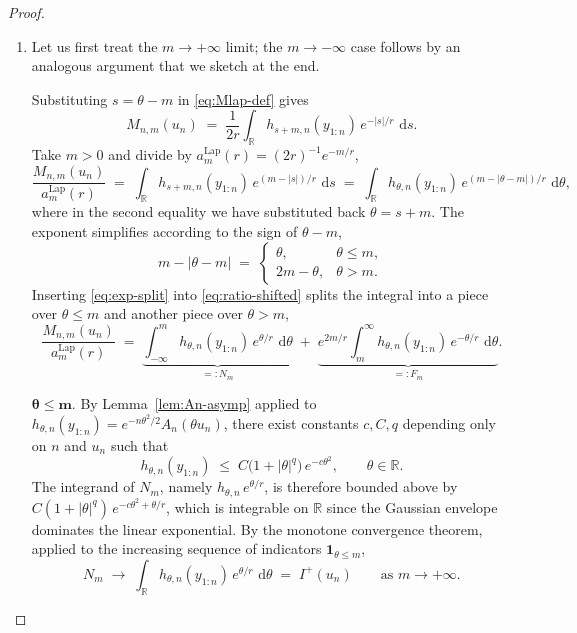 \documentclass[numsec,webpdf,modern,medium,namedate]{oup-authoring-template}
\theoremstyle{thmstyleone}%
\theoremstyle{thmstyletwo}%
\theoremstyle{thmstylethree}%
\newcommand{\dd}{\,\mathrm{d}}
\newcommand{\Lap}{\mathrm{Lap}}
\newcommand{\1}{\mathbf{1}}
\begin{document}
\begin{proof}
\begin{enumerate}
    \item[(a)] Let us first treat the $m\to+\infty$ limit; the $m\to-\infty$ case follows by an
analogous argument that we sketch at the end.

Substituting $s = \theta - m$ in \eqref{eq:Mlap-def} gives
\begin{equation}\label{eq:Mlap-shifted}
  M_{n,m}(u_n)
  \;=\;\frac{1}{2r}\int_\mathbb{R} h_{s+m,n}(y_{1:n})\,e^{-|s|/r}\,\dd s.
\end{equation}
Take $m>0$ and divide by $a_m^{\Lap}(r) = (2r)^{-1}e^{-m/r}$,
\begin{equation}\label{eq:ratio-shifted}
  \frac{M_{n,m}(u_n)}{a_m^{\Lap}(r)}
  \;=\;\int_\mathbb{R} h_{s+m,n}(y_{1:n})\,e^{(m-|s|)/r}\,\dd s
  \;=\;\int_\mathbb{R} h_{\theta,n}(y_{1:n})\,e^{(m-|\theta-m|)/r}\,\dd\theta,
\end{equation}
where in the second equality we have substituted back $\theta = s+m$.
The exponent simplifies according to the sign of $\theta-m$,
\begin{equation}\label{eq:exp-split}
  m - |\theta-m|
  \;=\;
  \begin{cases}
    \theta, & \theta \leq m,\\[2pt]
    2m-\theta, & \theta > m.
  \end{cases}
\end{equation}
Inserting \eqref{eq:exp-split} into \eqref{eq:ratio-shifted} splits the
integral into a piece over $\theta\leq m$ and another piece over $\theta>m$,
\begin{equation}\label{eq:two-pieces}
  \frac{M_{n,m}(u_n)}{a_m^{\Lap}(r)}
  \;=\;\underbrace{\int_{-\infty}^m h_{\theta,n}(y_{1:n})\,e^{\theta/r}\,\dd\theta}_{=:N_m}
  \;+\;\underbrace{e^{2m/r}\int_m^\infty h_{\theta,n}(y_{1:n})\,e^{-\theta/r}\,\dd\theta}_{=:F_m}.
\end{equation}

$\mathbf{\theta \leq m.}$ \quad
By Lemma~\ref{lem:An-asymp} applied to $h_{\theta,n}(y_{1:n})
= e^{-n\theta^2/2}A_n(\theta u_n)$, there exist constants
$c, C, q$ depending only on $n$ and $u_n$ such that
\begin{equation}\label{eq:h-env}
  h_{\theta,n}(y_{1:n})
  \;\leq\; C\bigl(1+|\theta|^q\bigr)\,e^{-c\theta^2},
  \qquad \theta\in\mathbb{R}.
\end{equation}
The integrand of $N_m$, namely $h_{\theta,n}\,e^{\theta/r}$, is
therefore bounded above by $C(1+|\theta|^q)\,e^{-c\theta^2+\theta/r}$,
which is integrable on $\mathbb{R}$ since the Gaussian envelope dominates the linear exponential. By the monotone convergence theorem, applied to
the increasing sequence of indicators $\1_{\theta\leq m}$,
\begin{equation}\label{eq:near-limit}
  N_m \;\longrightarrow\;\int_\mathbb{R} h_{\theta,n}(y_{1:n})\,e^{\theta/r}\,\dd\theta
  \;=\;I^+(u_n)
  \qquad\text{as }m\to+\infty.
\end{equation}


\end{enumerate}
\end{proof}
\end{document}
